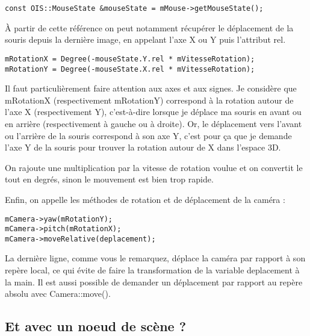 \documentclass[10pt,a4paper]{report}
\begin{document}
\begin{lstlisting}[caption={}]
const OIS::MouseState &mouseState = mMouse->getMouseState();
\end{lstlisting}

\`A partir de cette r\'ef\'erence on peut notamment r\'ecup\'erer le d\'eplacement de la souris depuis la derni\`ere image, en appelant l'axe X ou Y puis l'attribut rel.


\begin{lstlisting}[caption={}]
mRotationX = Degree(-mouseState.Y.rel * mVitesseRotation);
mRotationY = Degree(-mouseState.X.rel * mVitesseRotation);
\end{lstlisting}

Il faut particuli\`erement faire attention aux axes et aux signes. Je consid\`ere que mRotationX (respectivement mRotationY) correspond \`a la rotation autour de l'axe X (respectivement Y), c'est-\`a-dire lorsque je d\'eplace ma souris en avant ou en arri\`ere (respectivement \`a gauche ou \`a droite). Or, le d\'eplacement vers l'avant ou l'arri\`ere de la souris correspond \`a son axe Y, c'est pour \c{c}a que je demande l'axe Y de la souris pour trouver la rotation autour de X dans l'espace 3D.

On rajoute une multiplication par la vitesse de rotation voulue et on convertit le tout en degr\'es, sinon le mouvement est bien trop rapide.

Enfin, on appelle les m\'ethodes de rotation et de d\'eplacement de la cam\'era :

\begin{lstlisting}[caption={}]
mCamera->yaw(mRotationY);
mCamera->pitch(mRotationX);
mCamera->moveRelative(deplacement);
\end{lstlisting}

La derni\`ere ligne, comme vous le remarquez, d\'eplace la cam\'era par rapport \`a son rep\`ere local, ce qui \'evite de faire la transformation de la variable deplacement \`a la main. Il est aussi possible de demander un d\'eplacement par rapport au rep\`ere absolu avec Camera::move().


















\subsection{Et avec un noeud de sc\`ene ?}
\end{document}

